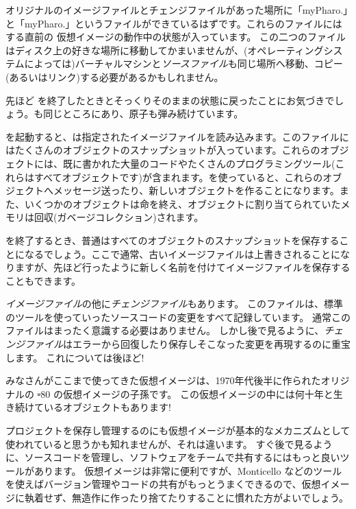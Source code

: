 \documentclass[a4paper,10pt,twoside]{book}
\begin{document}
オリジナルのイメージファイルとチェンジファイルがあった場所に「myPharo.」と「myPharo.」というファイルができているはずです。これらのファイルには  する直前の \pharo 仮想イメージの動作中の状態が入っています。
この二つのファイルはディスク上の好きな場所に移動してかまいませんが、(オペレーティングシステムによっては)バーチャルマシンと\emph{ソースファイル}も同じ場所へ移動、コピー(あるいはリンク)する必要があるかもしれません。


先ほど \pharo を終了したときとそっくりそのままの状態に戻ったことにお気づきでしょう。\bam も同じところにあり、原子も弾み続けています。

\pharo を起動すると、\pharo {}は指定されたイメージファイルを読み込みます。このファイルにはたくさんのオブジェクトのスナップショットが入っています。これらのオブジェクトには、既に書かれた大量のコードやたくさんのプログラミングツール(これらはすべてオブジェクトです)が含まれます。\pharo を使っていると、これらのオブジェクトへメッセージ送ったり、新しいオブジェクトを作ることになります。また、いくつかのオブジェクトは命を終え、オブジェクトに割り当てられていたメモリは回収(\ie ガベージコレクション)されます。

\pharo を終了するとき、普通はすべてのオブジェクトのスナップショットを保存することになるでしょう。ここで通常、古いイメージファイルは上書きされることになりますが、先ほど行ったように新しく名前を付けてイメージファイルを保存することもできます。

\emph{イメージファイル}の他に\emph{チェンジファイル}もあります。
このファイルは、標準のツールを使っていったソースコードの変更をすべて記録しています。
通常このファイルはまったく意識する必要はありません。
しかし後で見るように、\emph{チェンジファイル}はエラーから回復したり保存しそこなった変更を再現するのに重宝します。
これについては後ほど!

みなさんがここまで使ってきた仮想イメージは、1970年代後半に作られたオリジナルの \st-80 の仮想イメージの子孫です。
この仮想イメージの中には何十年と生き続けているオブジェクトもあります!

プロジェクトを保存し管理するのにも仮想イメージが基本的なメカニズムとして使われていると思うかも知れませんが、それは違います。
すぐ後で見るように、ソースコードを管理し、ソフトウェアをチームで共有するにはもっと良いツールがあります。
仮想イメージは非常に便利ですが、Monticello などのツールを使えばバージョン管理やコードの共有がもっとうまくできるので、仮想イメージに執着せず、無造作に作ったり捨てたりすることに慣れた方がよいでしょう。
\end{document}
